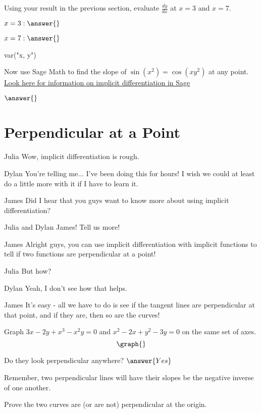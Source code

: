 \documentclass{ximera}
\begin{document}
\begin{question}
Using your result in the previous section, evaluate $\frac{dy}{dx}$ at $x = 3$ and $x = 7$.

$x = 3: \answer{}$

$x = 7: \answer{}$
\end{question}
\begin{question}
\begin{onlineOnly}
\begin{sageCell}
var("x, y")

\end{sageCell}
\end{onlineOnly}

Now use Sage Math to find the slope of  $\sin(x^2)=\cos(xy^2)$ at any point. \href{http://doc.sagemath.org/html/en/tutorial/tour_algebra.html#differentiation-integration-etc}{Look here for information on implicit differentiation in Sage}

$\answer{}$
\end{question}
\section{Perpendicular at a Point}
\begin{dialogue}
\item[Julia] Wow, implicit differentiation is rough.
\item[Dylan] You're telling me... I've been doing this for hours! I wish we could at least do a little more with it if I have to learn it.
\item[James] Did I hear that you guys want to know more about using implicit differentiation?
\item[Julia and Dylan] James! Tell us more!
\item[James] Alright guys, you can use implicit differentiation with implicit functions to tell if two functions are perpendicular at a point!
\item[Julia] But how?
\item[Dylan] Yeah, I don't see how that helps.
\item[James] It's easy - all we have to do is see if the tangent lines are perpendicular at that point, and if they are, then so are the curves!
\end{dialogue}
\begin{question}
Graph $3x - 2y + x^3-x^2y = 0$ and $x^2 - 2x + y^2 - 3y = 0$ on the same set of axes.
\[
\graph{}
\]

Do they look perpendicular anywhere?
$\answer{Yes}$
\end{question}
\begin{question}
\begin{hint}
Remember, two perpendicular lines will have their slopes be the negative inverse of one another.
\end{hint}
Prove the two curves are (or are not) perpendicular at the origin.
\begin{freeResponse}
\end{freeResponse}
\end{question}
\end{document}
